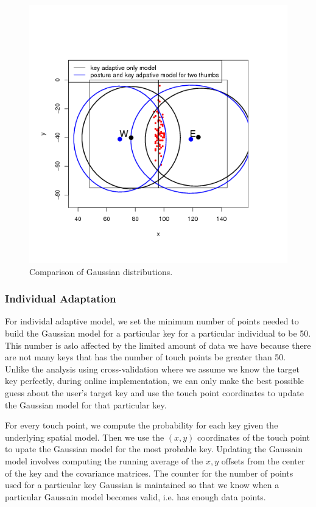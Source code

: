 \documentclass{sigchi}
\begin{document}
\begin{figure}[tb]
 \includegraphics[width=1\columnwidth]{figures/key-posture-ellipse.png}
  \caption{Comparison of Gaussian distributions.}
  \label{fig:e-w-ellipses}
\end{figure}

\subsubsection{Individual Adaptation}
For individal adaptive model, we set the minimum number of points needed to build the
Gaussian model for a particular key for a particular individual to be 50. This number is 
aslo affected by the limited amount of data we have because there are not many keys that has 
the number of touch points be greater than 50. Unlike the analysis using cross-validation
where we assume we know the target key perfectly, during online implementation, we can
only make the best possible guess about the user's target key and use the touch point
coordinates to update the Gaussian model for that particular key.

For every touch point, we compute the probability for each key given the underlying spatial model.
Then we use the $(x, y)$ coordinates of the touch point to upate the Gaussian model
for the most probable key. Updating the Gaussain model involves computing the running
average of the $x, y$ offsets from the center of the key and the covariance matrices. The counter 
for the number of points used for a particular key Gaussian is maintained so that we
know when a particular Gaussain model becomes valid, i.e. has enough data points.
\end{document}
